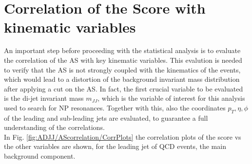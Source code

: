 \section{Correlation of the Score with kinematic variables}\label{sec:ADJJ/AScorrelation}

An important step before proceeding with the statistical analysis is to evaluate the correlation of the AS with key kinematic variables.
This evalution is needed to verify that the AS is not strongly coupled with the kinematics of the events, which would lead to a distortion of the background invariant mass distribution after applying a cut on the AS.
In fact, the first crucial variable to be evaluated is the di-jet invariant mass $m_{JJ}$, which is the variable of interest for this analysis used to search for NP resonances.
Together with this, also the coordinates $p_T, \eta, \phi$ of the leading and sub-leading jets are evaluated, to guarantee a full understanding of the correlations.\\
In Fig. \ref{fig:ADJJ/AScorrelation/CorrPlots} the correlation plots of the score vs the other variables are shown, for the leading jet of QCD events, the main background component.


